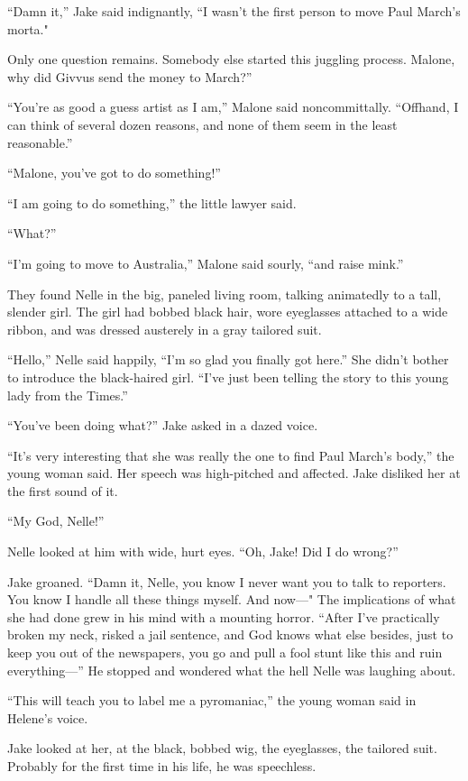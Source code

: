 \documentclass{novel}
\begin{document}
“Damn it,” Jake said indignantly, “I wasn’t the first person to move Paul March’s morta."

Only one question remains. Somebody else started this juggling process. Malone, why did Givvus send the money to March?”

“You’re as good a guess artist as I am,” Malone said noncommittally. “Offhand, I can think of several dozen reasons, and none of them seem in the least reasonable.”

“Malone, you’ve got to do something!”

“I am going to do something,” the little lawyer said.

“What?”

“I’m going to move to Australia,” Malone said sourly, “and raise mink.”

They found Nelle in the big, paneled living room, talking animatedly to a tall, slender girl. The girl had bobbed black hair, wore eyeglasses attached to a wide ribbon, and was dressed austerely in a gray tailored suit.

“Hello,” Nelle said happily, “I’m so glad you finally got here.” She didn’t bother to introduce the black-haired girl. “I've just been telling the story to this young lady from the Times.”

“You’ve been doing what?” Jake asked in a dazed voice.

“It’s very interesting that she was really the one to find Paul March’s body,” the young woman said. Her speech was high-pitched and affected. Jake disliked her at the first sound of it.

“My God, Nelle!”

Nelle looked at him with wide, hurt eyes. “Oh, Jake! Did I do wrong?”

Jake groaned. “Damn it, Nelle, you know I never want you to talk to reporters. You know I handle all these things myself. And now—" The implications of what she had done grew in his mind with a mounting horror. “After I’ve practically broken my neck, risked a jail sentence, and God knows what else besides, just to keep you out of the newspapers, you go and pull a fool stunt like this and ruin everything—” He stopped and wondered what the hell Nelle was laughing about.

“This will teach you to label me a pyromaniac,” the young woman said in Helene’s voice.

Jake looked at her, at the black, bobbed wig, the eyeglasses, the tailored suit. Probably for the first time in his life, he was speechless.
\end{document}
